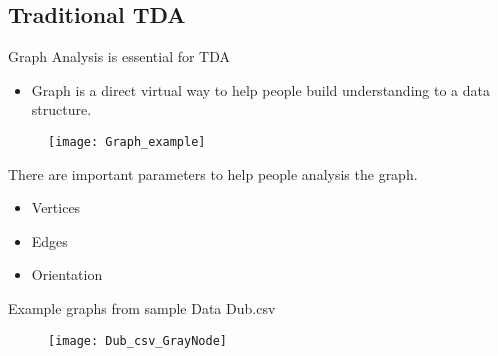 \documentclass{beamer}
\theoremstyle{definition}
\newtheorem{defn}{Definition}
\theoremstyle{example}
\theoremstyle{conjecture}
\begin{document}
\subsection{Traditional TDA}
\label{subsc.tradtda}


\begin{frame}
Graph Analysis is essential for TDA
	\begin{itemize}
    	\item Graph is a direct virtual way to help people build understanding to a data structure.
	\end{itemize}
\begin{figure}
\texttt{[image: Graph\_example]}
\end{figure}
\end{frame}

\begin{frame}
There are important parameters to help people analysis the graph.\\
\begin{itemize}
    \item Vertices %
    \item Edges
    \item Orientation %
\end{itemize}
\end{frame}

\begin{frame}
Example graphs from sample Data Dub.csv
\begin{figure}
\texttt{[image: Dub\_csv\_GrayNode]}
\end{figure}
\end{frame}
\end{document}
